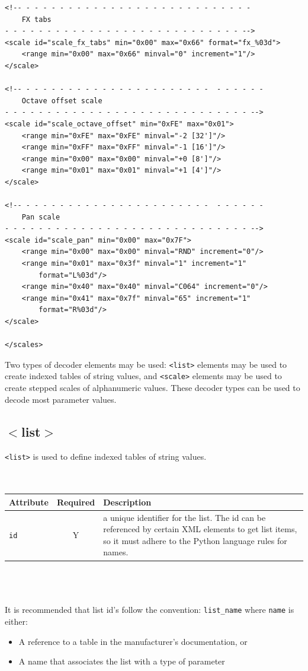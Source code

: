 \documentclass[a4paper,twoside,12pt]{article}
\newcommand{\code}[1]{\color{red}\texttt{#1}\color{black}}
\begin{document}
\begin{verbatim}
<!-- - - - - - - - - - - - - - - - - - - - - - - - - - - -
    FX tabs
- - - - - - - - - - - - - - - - - - - - - - - - - - - - -->
<scale id="scale_fx_tabs" min="0x00" max="0x66" format="fx_%03d">
    <range min="0x00" max="0x66" minval="0" increment="1"/>
</scale>

<!-- - - - - - - - - - - - - - - - - - - - - - -  - - - - - -
    Octave offset scale
- - - - - - - - - - - - - - - - - - - - - - - - - - - - - -->
<scale id="scale_octave_offset" min="0xFE" max="0x01">
    <range min="0xFE" max="0xFE" minval="-2 [32']"/>
    <range min="0xFF" max="0xFF" minval="-1 [16']"/>
    <range min="0x00" max="0x00" minval="+0 [8']"/>
    <range min="0x01" max="0x01" minval="+1 [4']"/>
</scale>

<!-- - - - - - - - - - - - - - - - - - - - - - -  - - - - - -
    Pan scale
- - - - - - - - - - - - - - - - - - - - - - - - - - - - - -->
<scale id="scale_pan" min="0x00" max="0x7F">
    <range min="0x00" max="0x00" minval="RND" increment="0"/>
    <range min="0x01" max="0x3f" minval="1" increment="1"
        format="L%03d"/>
    <range min="0x40" max="0x40" minval="C064" increment="0"/>
    <range min="0x41" max="0x7f" minval="65" increment="1"
        format="R%03d"/>
</scale>

</scales>
\end{verbatim}

Two types of decoder elements may be used: \code{<list>}{}
elements may be used to create indexed tables of string values,
and \code{<scale>}{} elements may be used to create stepped scales
of alphanumeric values. These decoder types can be used to decode
most parameter values.

\subsection{$<$list$>$}
 \code{<list>}{} is used to define indexed tables of string
 values.
\\
\\
\\
\begin{tabular}{|l|c|p{9cm}|}
\hline
Attribute & Required & Description \\
\hline \code{id} & Y & a unique identifier for the list. The id
can be referenced by certain XML elements to get list items, so it
must adhere to the Python language rules for names.   \\
\hline
\end{tabular}
\\
\\
\\
It is recommended that list id's follow the convention:
     \code{list\_name}{} where \code{name}{} is either:
\begin{itemize}
\item A reference to a table in the manufacturer's documentation,
or \item A name that associates the list with a type of parameter
\end{itemize}
\end{document}

